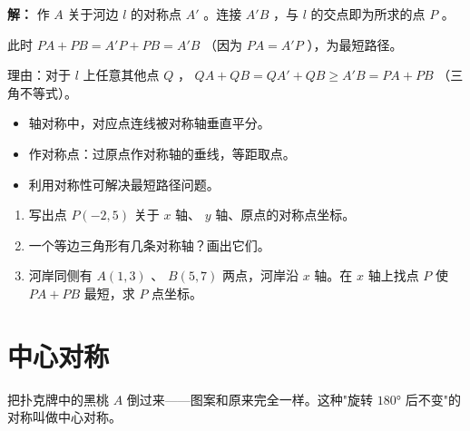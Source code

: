 \begin{workedexamples}
\begin{center}
\label{fig:shortest-path-river}
\end{center}


\textbf{解：}
作 $A$ 关于河边 $l$ 的对称点 $A'$ 。连接 $A'B$ ，与 $l$ 的交点即为所求的点 $P$ 。

此时 $PA + PB = A'P + PB = A'B$ （因为 $PA = A'P$ ），为最短路径。

理由：对于 $l$ 上任意其他点 $Q$ ， $QA + QB = QA' + QB \geq A'B = PA + PB$ （三角不等式）。

\end{workedexamples}

\begin{keytakeaway}


\begin{itemize}
  \item 轴对称中，对应点连线被对称轴垂直平分。
  \item 作对称点：过原点作对称轴的垂线，等距取点。
  \item 利用对称性可解决最短路径问题。
\end{itemize}


\end{keytakeaway}

\begin{practice}


\begin{enumerate}
  \item 写出点 $P(-2, 5)$ 关于 $x$ 轴、 $y$ 轴、原点的对称点坐标。
  \item 一个等边三角形有几条对称轴？画出它们。
  \item 河岸同侧有 $A(1, 3)$ 、 $B(5, 7)$ 两点，河岸沿 $x$ 轴。在 $x$ 轴上找点 $P$ 使 $PA + PB$ 最短，求 $P$ 点坐标。
\end{enumerate}


\end{practice}



\section*{中心对称}


\begin{explore}


把扑克牌中的黑桃 $A$ 倒过来——图案和原来完全一样。这种"旋转 $180°$ 后不变"的对称叫做中心对称。

\end{explore}

